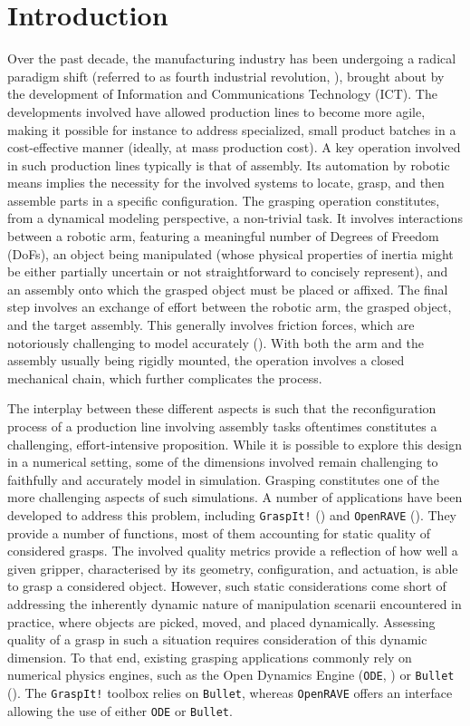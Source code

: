 \section{Introduction}\label{sec:introduction}
%
Over the past decade, the manufacturing industry has been undergoing a radical paradigm shift (referred to as fourth industrial revolution, \cite{schuh2017}), brought about by the development of Information and Communications Technology (ICT). The developments involved have allowed production lines to become more agile, making it possible for instance to address specialized, small product batches in a cost-effective manner (ideally, at mass production cost). A key operation involved in such production lines typically is that of assembly. Its automation by robotic means implies the necessity for the involved systems to locate, grasp, and then assemble parts in a specific configuration. The grasping operation constitutes, from a dynamical modeling perspective, a non-trivial task. It involves interactions between a robotic arm, featuring a meaningful number of Degrees of Freedom (DoFs), an object being manipulated (whose physical properties of inertia might be either partially uncertain or not straightforward to concisely represent), and an assembly onto which the grasped object must be placed or affixed. The final step involves an exchange of effort between the robotic arm, the grasped object, and the target assembly. This generally involves friction forces, which are notoriously challenging to model accurately (\cite{haessig1991}). With both the arm and the assembly usually being rigidly mounted, the operation involves a closed mechanical chain, which further complicates the process.

The interplay between these different aspects is such that the reconfiguration process of a production line involving assembly tasks oftentimes constitutes a challenging, effort-intensive proposition. While it is possible to explore this design in a numerical setting, some of the dimensions involved remain challenging to faithfully and accurately model in simulation. Grasping constitutes one of the more challenging aspects of such simulations. A number of applications have been developed to address this problem, including \texttt{GraspIt!} (\cite{graspit}) and \texttt{OpenRAVE} (\cite{openrave}). They provide a number of functions, most of them accounting for static quality of considered grasps. The involved quality metrics provide a reflection of how well a given gripper, characterised by its geometry, configuration, and actuation, is able to grasp a considered object. However, such static considerations come short of addressing the inherently dynamic nature of manipulation scenarii encountered in practice, where objects are picked, moved, and placed dynamically. Assessing quality of a grasp in such a situation requires consideration of this dynamic dimension. To that end, existing grasping applications commonly rely on numerical physics engines, such as the Open Dynamics Engine (\texttt{ODE}, \cite{smith2005}) or \texttt{Bullet} (\cite{bullet_physics_library}). The \texttt{GraspIt!} toolbox relies on \texttt{Bullet}, whereas \texttt{OpenRAVE} offers an interface allowing the use of either \texttt{ODE} or \texttt{Bullet}.

